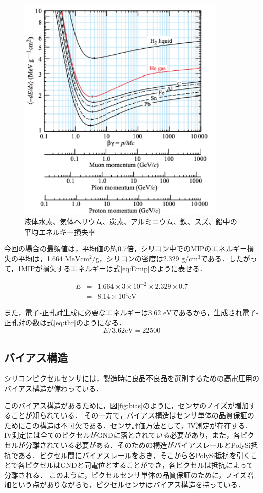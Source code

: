 \begin{figure}[h]
  \centering
  \includegraphics[width=10cm]{./figure/Landau.png}
  \caption{液体水素、気体ヘリウム、炭素、アルミニウム、鉄、スズ、鉛中の平均エネルギー損失率\cite{Tanabashi:2018oca}}
  \label{fig:landau}
\end{figure}


今回の場合の最頻値は，平均値の約0.7倍，シリコン中でのMIPのエネルギー損失の平均は，1.664 $\mathrm{MeV cm^2/g}$，シリコンの密度は2.329 $\mathrm{g/cm^3}$である．したがって，1MIPが損失するエネルギーは式\ref{eq:Emip}のように表せる．

\begin{eqnarray}
  E &=& 1.664 \times 3 \times 10^{-2} \times 2.329 \times 0.7 \nonumber \\
  \label{eq:Emip}
  &=& 8.14 \times 10^4 \mathrm{eV}
\end{eqnarray}

また，電子-正孔対生成に必要なエネルギーは3.62 $\mathrm{eV}$であるから，生成され電子-正孔対の数は式\ref{eq:thr}のようになる．
\begin{equation}
  \label{eq:thr}
  E / 3.62 \mathrm{eV} = 22500
\end{equation}


\subsection{バイアス構造}
シリコンピクセルセンサには，製造時に良品不良品を選別するための高電圧用のバイアス構造が備わっている．\par
このバイアス構造があるために，図\ref{fig:bias}のように，センサのノイズが増加することが知られている．
その一方で，バイアス構造はセンサ単体の品質保証のためにこの構造は不可欠である．センサ評価方法として，IV測定が存在する．IV測定には全てのピクセルがGNDに落とされている必要があり，また，各ピクセルが分離されている必要がある．そのための構造がバイアスレールとPolySi抵抗である．ピクセル間にバイアスレールをおき，そこから各PolySi抵抗を引くことで各ピクセルはGNDと同電位とすることができ，各ピクセルは抵抗によって分離される．
このように，ピクセルセンサ単体の品質保証のために，ノイズ増加という点がありながらも，ピクセルセンサはバイアス構造を持っている．

